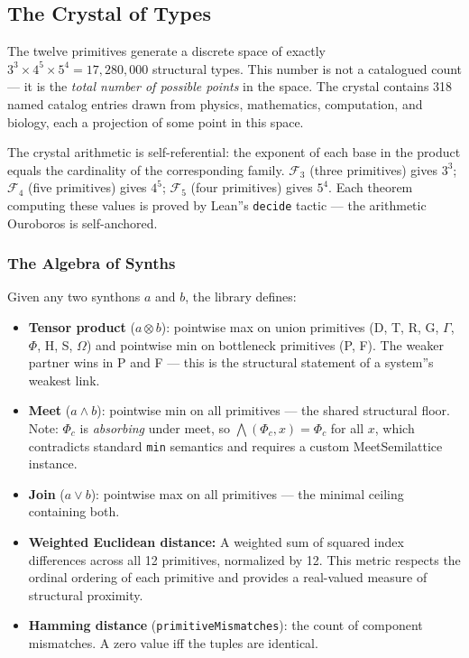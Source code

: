 \documentclass[12pt,a4paper]{article}
\begin{document}
\subsection{The Crystal of Types}

The twelve primitives generate a discrete space of exactly $3^3 \times 4^5 \times 5^4 = 17{,}280{,}000$ structural types. This number is not a catalogued count --- it is the \emph{total number of possible points} in the space. The crystal contains 318 named catalog entries drawn from physics, mathematics, computation, and biology, each a projection of some point in this space.

The crystal arithmetic is self-referential: the exponent of each base in the product equals the cardinality of the corresponding family. $\mathcal{F}_3$ (three primitives) gives $3^3$; $\mathcal{F}_4$ (five primitives) gives $4^5$; $\mathcal{F}_5$ (four primitives) gives $5^4$. Each theorem computing these values is proved by Lean''s \texttt{decide} tactic --- the arithmetic Ouroboros is self-anchored.

\subsubsection{The Algebra of Synths}

Given any two synthons $a$ and $b$, the library defines:

\begin{itemize}
    \item \textbf{Tensor product} ($a \otimes b$): pointwise max on union primitives (D, T, R, G, $\Gamma$, $\Phi$, H, S, $\Omega$) and pointwise min on bottleneck primitives (P, F). The weaker partner wins in P and F --- this is the structural statement of a system''s weakest link.
    \item \textbf{Meet} ($a \wedge b$): pointwise min on all primitives --- the shared structural floor. Note: $\Phi_c$ is \emph{absorbing} under meet, so $\bigwedge(\Phi_c, x) = \Phi_c$ for all $x$, which contradicts standard \texttt{min} semantics and requires a custom MeetSemilattice instance.
    \item \textbf{Join} ($a \vee b$): pointwise max on all primitives --- the minimal ceiling containing both.
    \item \textbf{Weighted Euclidean distance:} A weighted sum of squared index differences across all 12 primitives, normalized by 12. This metric respects the ordinal ordering of each primitive and provides a real-valued measure of structural proximity.
    \item \textbf{Hamming distance} (\texttt{primitiveMismatches}): the count of component mismatches. A zero value iff the tuples are identical.
\end{itemize}
\end{document}

